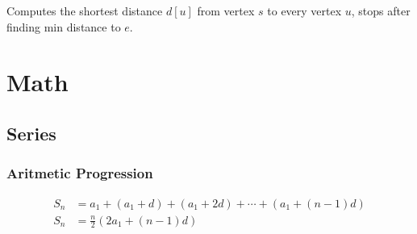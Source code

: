 \documentclass{article}
\begin{document}
\noindent\begin{minipage}{\linewidth}

\end{minipage}
Computes the shortest distance $d[u]$ from vertex $s$ to every vertex $u$,
stops after finding min distance to $e$.

\section{Math}
\subsection{Series}
\subsubsection{Aritmetic Progression}
\begin{align*}
  S_n &= a_1 + (a_1+d) + (a_1+2d) + \cdots + (a_1+(n-1)d)\\
  S_n &= \frac{n}{2}(2a_1+(n-1)d)
\end{align*}
\end{document}
